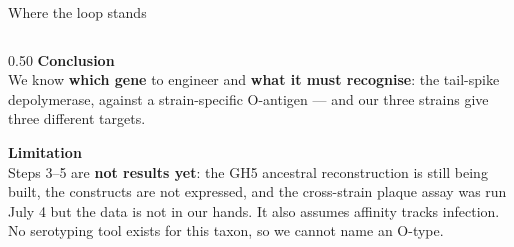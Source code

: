 \documentclass[aspectratio=169,12pt]{beamer}
\begin{document}
\begin{frame}[shrink=5]{Where the loop stands}
  \begin{columns}[T,onlytextwidth]
    \begin{column}{0.50\textwidth}
      \small
      \textcolor{accent}{\textbf{Conclusion}}\\
      We know \textbf{which gene} to engineer and \textbf{what it must recognise}: the tail-spike
      depolymerase, against a strain-specific O-antigen — and our three strains give three different
      targets.
      \vspace{6pt}

      \textcolor{accent}{\textbf{Limitation}}\\
      Steps 3–5 are \textbf{not results yet}: the GH5 ancestral reconstruction is still being built,
      the constructs are not expressed, and the cross-strain plaque assay was run July 4 but the data
      is not in our hands. It also assumes affinity tracks infection. No serotyping tool exists for
      this taxon, so we cannot name an O-type.
      \vspace{6pt}


\end{column}
\end{columns}
\end{frame}
\end{document}
